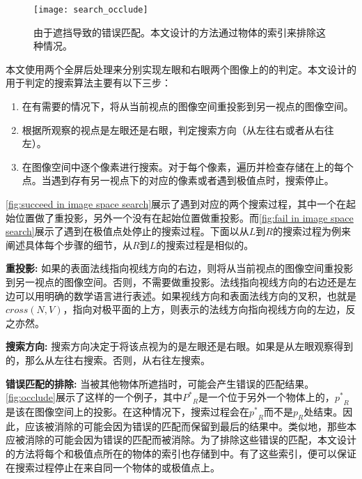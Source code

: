 {\begin{figure}[tbh]
    \centering
    \texttt{[image: search\_occlude]}
    \caption{\label{fig:occlude}
    由于遮挡导致的错误匹配。本文设计的方法通过物体的索引来排除这种情况。}
\end{figure}

本文使用两个全屏后处理来分别实现左眼和右眼两个图像上的\epsl{}的判定。本文设计的用于\epsl{}判定的搜索算法主要有以下三步：

\begin{enumerate}
    \item 在有需要的情况下，将\conp{}从当前视点的图像空间重投影到另一视点的图像空间。
    \item 根据\conp{}所观察的视点是左眼还是右眼，判定搜索方向（从左往右或者从右往左）。
    \item 在图像空间中逐个像素进行搜索。对于每个像素，遍历并检查存储在\ppll{}上的每个点。当遇到存有另一视点下的对应\conp{}的像素或者遇到极值点时，搜索停止。
\end{enumerate}

\autoref{fig:succeed in image space search}展示了遇到对应\conp{}的两个搜索过程，其中一个在起始位置做了重投影，另外一个没有在起始位置做重投影。而\autoref{fig:fail in image space search}展示了遇到在极值点处停止的搜索过程。下面以从$L$到$R$的搜索过程为例来阐述具体每个步骤的细节，从$R$到$L$的搜索过程是相似的。

{\textbf{重投影:} 如果\conp{}的表面法线指向视线方向的右边，则将\conp{}从当前视点的图像空间重投影到另一视点的图像空间。否则，不需要做重投影。法线指向视线方向的右边还是左边可以用明确的数学语言进行表述。如果视线方向和表面法线方向的叉积，也就是$cross(N, V)$，指向对极平面的上方，则表示\conp{}的法线方向指向视线方向的左边，反之亦然。

\textbf{搜索方向:} 搜索方向决定于将该点视为\conp{}的是左眼还是右眼。如果\conp{}是从左眼观察得到的，那么从左往右搜索。否则，从右往左搜索。

\textbf{错误匹配的排除:} 当\ec{}被其他物体所遮挡时，可能会产生错误的匹配结果。\autoref{fig:occlude}展示了这样的一个例子，其中${P^*}_R$是一个位于另外一个物体上的\conp{}，${p^*}_R$是该\conp{}在图像空间上的投影。在这种情况下，搜索过程会在${p^*}_R$而不是$p_R$处结束。因此，应该被消除的\conp{}可能会因为错误的匹配而保留到最后的结果中。类似地，那些本应被消除的\conp{}可能会因为错误的匹配而被消除。为了排除这些错误的匹配，本文设计的方法将每个\conp{}和极值点所在的物体的索引也存储到\ppll{}中。有了这些索引，便可以保证在搜索过程停止在来自同一个物体的\conp{}或极值点上。

}}
